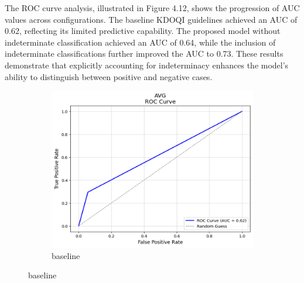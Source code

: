 The ROC curve analysis, illustrated in Figure 4.12, shows the progression of AUC values across configurations. The baseline KDOQI guidelines achieved an AUC of 0.62, reflecting its limited predictive capability. The proposed model without indeterminate classification achieved an AUC of 0.64, while the inclusion of indeterminate classifications further improved the AUC to 0.73. These results demonstrate that explicitly accounting for indeterminacy enhances the model’s ability to distinguish between positive and negative cases.

\begin{figure}[H]
    \centering
    \begin{subfigure}[b]{0.5\textwidth}
        \centering
        \includegraphics[width=\linewidth]{figures/AVG_baseline_roc.png}
        \caption{baseline}
        \label{fig:vascular-access-roc}
    \end{subfigure}
    
    \vspace{1em} %


\end{figure}
